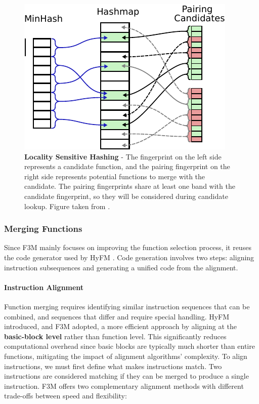 \begin{figure}[h!]
\centering
\includegraphics[scale=1]{Figures/F3M_LSH.pdf}
\caption{\textbf{Locality Sensitive Hashing} - The fingerprint on the left side represents a candidate function, and the pairing fingerprint on the right side represents potential functions to merge with the candidate. The pairing fingerprints share at least one band with the candidate fingerprint, so they will be considered during candidate lookup. Figure taken from  \cite{F3M:FastFocusedFunctionMerging}.}\label{fig:F3M:LSH}
\end{figure}

\subsubsection{Merging Functions}
Since F3M mainly focuses on improving the function selection process, it reuses the code generator used by HyFM \cite{HyFM:FunctionMergingForFree}. Code generation involves two steps: aligning instruction subsequences and generating a unified code from the alignment.

\paragraph{Instruction Alignment}
Function merging requires identifying similar instruction sequences that can be combined, and sequences that differ and require special handling. HyFM introduced, and F3M adopted, a more efficient approach by aligning at the \textbf{basic-block level} rather than function level. This significantly reduces computational overhead since basic blocks are typically much shorter than entire functions, mitigating the impact of alignment algorithms' complexity.
To align instructions, we must first define what makes instructions match. Two instructions are considered matching if they can be merged to produce a single instruction. F3M offers two complementary alignment methods with different trade-offs between speed and flexibility:

